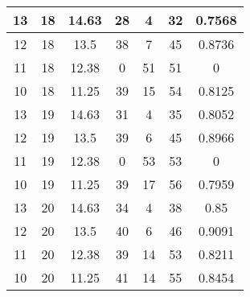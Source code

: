 \documentclass[letterpaper, 12pt]{article}
\begin{document}
\begin{longtable}{|c|c|c|c|c|c|c|}
\hline
13 & 18 & 14.63 & 28 & 4 & 32 & 0.7568 \\
\hline
12 & 18 & 13.5 & 38 & 7 & 45 & 0.8736 \\
\hline
11 & 18 & 12.38 & 0 & 51 & 51 & 0 \\
\hline
10 & 18 & 11.25 & 39 & 15 & 54 & 0.8125 \\
\hline
13 & 19 & 14.63 & 31 & 4 & 35 & 0.8052 \\
\hline
12 & 19 & 13.5 & 39 & 6 & 45 & 0.8966 \\
\hline
11 & 19 & 12.38 & 0 & 53 & 53 & 0 \\
\hline
10 & 19 & 11.25 & 39 & 17 & 56 & 0.7959 \\
\hline
13 & 20 & 14.63 & 34 & 4 & 38 & 0.85 \\
\hline
12 & 20 & 13.5 & 40 & 6 & 46 & 0.9091 \\
\hline
11 & 20 & 12.38 & 39 & 14 & 53 & 0.8211 \\
\hline
10 & 20 & 11.25 & 41 & 14 & 55 & 0.8454 \\
\hline
\end{longtable}
\end{document}
